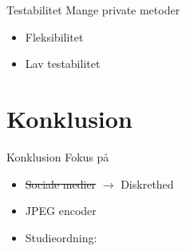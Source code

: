 \begin{frame}[fragile]{Testabilitet}
    Mange private metoder
    \begin{itemize}
        \item Fleksibilitet %
        \item Lav testabilitet
    \end{itemize}
    \begin{itemize}
    \end{itemize}
\end{frame}

\section{Konklusion}
\begin{frame}{Konklusion}
    Fokus på
    \begin{itemize}
        \item{\sout{Sociale medier} $\rightarrow$ Diskrethed}
        \item JPEG encoder
        \item Studieordning:
        \begin{itemize}
        \end{itemize}
    \end{itemize}
\end{frame}
